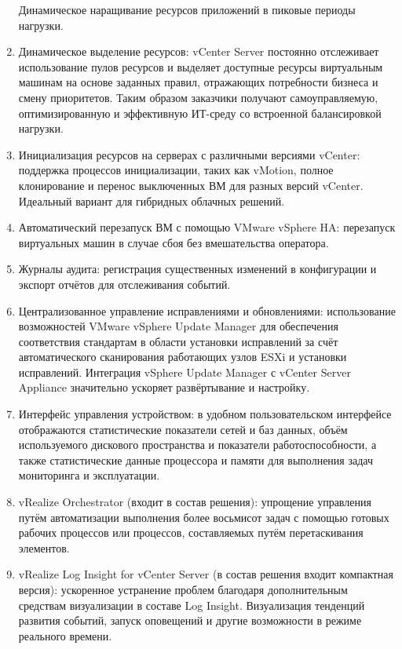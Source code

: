 \documentclass[14pt, a4paper]{article}
\begin{document}
\begin{enumerate}
    Динамическое наращивание ресурсов приложений в пиковые периоды нагрузки.
    \item Динамическое выделение ресурсов: vCenter Server постоянно отслеживает использование
    пулов ресурсов и выделяет доступные ресурсы виртуальным машинам на основе заданных
    правил, отражающих потребности бизнеса и смену приоритетов. Таким образом заказчики
    получают самоуправляемую, оптимизированную и эффективную ИТ-среду со встроенной
    балансировкой нагрузки.
    \item Инициализация ресурсов на серверах с различными версиями vCenter: поддержка процессов
    инициализации, таких как vMotion, полное клонирование и перенос выключенных ВМ для
    разных версий vCenter. Идеальный вариант для гибридных облачных решений.
    \item Автоматический перезапуск ВМ с помощью VMware vSphere HA: перезапуск виртуальных
    машин в случае сбоя без вмешательства оператора.
    \item Журналы аудита: регистрация существенных изменений в конфигурации и экспорт отчётов
    для отслеживания событий.
    \item Централизованное управление исправлениями и обновлениями: использование возможностей
    VMware vSphere Update Manager для обеспечения соответствия стандартам в области
    установки исправлений за счёт автоматического сканирования работающих узлов ESXi и
    установки исправлений. Интеграция vSphere Update Manager с vCenter Server Appliance
    значительно ускоряет развёртывание и настройку.
    \item Интерфейс управления устройством: в удобном пользовательском интерфейсе отображаются
    статистические показатели сетей и баз данных, объём используемого дискового пространства
    и показатели работоспособности, а также статистические данные процессора и памяти для
    выполнения задач мониторинга и эксплуатации.
    \item vRealize Orchestrator (входит в состав решения): упрощение управления путём автоматизации
    выполнения более восьмисот задач с помощью готовых рабочих процессов или процессов,
    составляемых путём перетаскивания элементов.
    \item vRealize Log Insight for vCenter Server (в состав решения входит компактная версия):
    ускоренное устранение проблем благодаря дополнительным средствам визуализации в
    составе Log Insight. Визуализация тенденций развития событий, запуск оповещений и другие
    возможности в режиме реального времени.
\end{enumerate}
\end{document}
